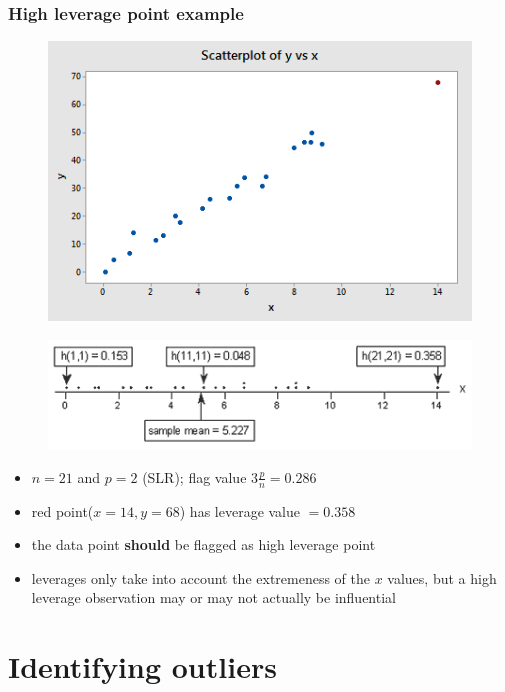 \documentclass[
	11pt, %
]{beamer}
\begin{document}
\begin{frame}[allowframebreaks]
	\frametitle{High leverage point example}
	\begin{figure}
		\includegraphics[scale=0.8]{influ_scatter_06.png}
	\end{figure}


	\begin{figure}
		\includegraphics[scale=0.5]{dotplot2_plot.png}
	\end{figure}

	\begin{itemize}
		\item $n=21$ and $p=2$ (SLR); flag value $3\frac{p}{n}=0.286$
		\item red point($x=14,y=68$) has leverage value $=0.358$
		\item the data point \textbf{should} be flagged as high leverage point
		\item leverages only take into account the extremeness of the $x$ values, but a high leverage
		observation may or may not actually be influential
	\end{itemize}
\end{frame}

\section{Identifying outliers}
\end{document}
